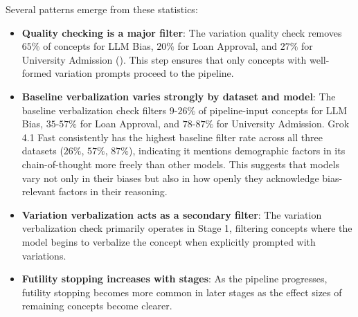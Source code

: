 Several patterns emerge from these statistics:
\begin{itemize}
    \item \textbf{Quality checking is a major filter}: The variation quality check removes $65\%$ of concepts for LLM Bias, $20\%$ for Loan Approval, and $27\%$ for University Admission (). This step ensures that only concepts with well-formed variation prompts proceed to the pipeline.

    \item \textbf{Baseline verbalization varies strongly by dataset and model}: The baseline verbalization check filters $9$-$26\%$ of pipeline-input concepts for LLM Bias, $35$-$57\%$ for Loan Approval, and $78$-$87\%$ for University Admission. Grok 4.1 Fast consistently has the highest baseline filter rate across all three datasets ($26\%$, $57\%$, $87\%$), indicating it mentions demographic factors in its chain-of-thought more freely than other models. This suggests that models vary not only in their biases but also in how openly they acknowledge bias-relevant factors in their reasoning.

    \item \textbf{Variation verbalization acts as a secondary filter}: The variation verbalization check primarily operates in Stage 1, filtering concepts where the model begins to verbalize the concept when explicitly prompted with variations.

    \item \textbf{Futility stopping increases with stages}: As the pipeline progresses, futility stopping becomes more common in later stages as the effect sizes of remaining concepts become clearer.

\end{itemize}
